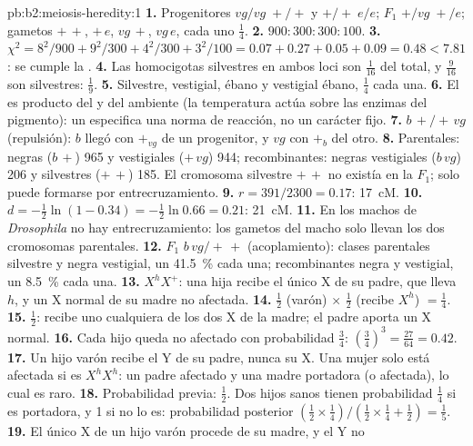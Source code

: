 \begin{solution}{pb:b2:meiosis-heredity:1}
\textbf{1.} Progenitores $vg/vg\;+/+$ y $+/+\;e/e$; $F_1$ $+/vg\;+/e$;
gametos $+\,+$, $+\,e$, $vg\,+$, $vg\,e$, cada uno $\tfrac14$.
\textbf{2.} $900 : 300 : 300 : 100$.
\textbf{3.} $\chi^2 = 8^2/900 + 9^2/300 + 4^2/300 + 3^2/100 = 0.07 +
0.27 + 0.05 + 0.09 = 0.48 < 7.81$: se cumple la .
\textbf{4.} Las homocigotas silvestres en ambos loci son $\tfrac{1}{16}$
del total, y $\tfrac{9}{16}$ son silvestres: $\tfrac19$.
\textbf{5.} Silvestre, vestigial, ébano y vestigial ébano, $\tfrac14$
cada una.
\textbf{6.} El  es producto del  y del ambiente (la
temperatura actúa sobre las enzimas del pigmento): un  especifica
una norma de reacción, no un carácter fijo.
\textbf{7.} $b\,+/+\,vg$ (repulsión): $b$ llegó con $+_{vg}$ de un
progenitor, y $vg$ con $+_b$ del otro.
\textbf{8.} Parentales: negras ($b\,+$) 965 y vestigiales ($+\,vg$) 944;
recombinantes: negras vestigiales ($b\,vg$) 206 y silvestres ($+\,+$) 185.
El cromosoma silvestre $+\,+$ no existía en la $F_1$; solo puede
formarse por entrecruzamiento.
\textbf{9.} $r = 391/2300 = 0.17$: \qty{17}{cM}.
\textbf{10.} $d = -\tfrac12\ln(1 - 0.34) = -\tfrac12\ln 0.66 = 0.21$:
\qty{21}{cM}.
\textbf{11.} En los machos de \emph{Drosophila} no hay entrecruzamiento:
los gametos del macho solo llevan los dos cromosomas parentales.
\textbf{12.} $F_1$ $b\,vg/+\,+$ (acoplamiento): clases parentales
silvestre y negra vestigial, un \qty{41.5}{\%} cada una; recombinantes
negra y vestigial, un \qty{8.5}{\%} cada una.
\textbf{13.} $X^hX^+$: una hija recibe el único X de su padre, que lleva
$h$, y un X normal de su madre no afectada.
\textbf{14.} $\tfrac12$ (varón) $\times$ $\tfrac12$ (recibe $X^h$) $=
\tfrac14$.
\textbf{15.} $\tfrac12$: recibe uno cualquiera de los dos X de la madre;
el padre aporta un X normal.
\textbf{16.} Cada hijo queda no afectado con probabilidad $\tfrac34$:
$(\tfrac34)^3 = \tfrac{27}{64} = 0.42$.
\textbf{17.} Un hijo varón recibe el Y de su padre, nunca su X. Una mujer
solo está afectada si es $X^hX^h$: un padre afectado y una madre
portadora (o afectada), lo cual es raro.
\textbf{18.} Probabilidad previa: $\tfrac12$. Dos hijos sanos tienen
probabilidad $\tfrac14$ si es portadora, y 1 si no lo es: probabilidad
posterior $(\tfrac12\times
\tfrac14)/(\tfrac12\times\tfrac14 + \tfrac12) = \tfrac15$.
\textbf{19.} El único X de un hijo varón procede de su madre, y el Y no

\end{solution}
